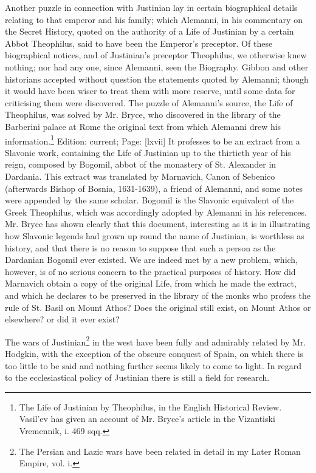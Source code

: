 Another puzzle in connection with Justinian lay in certain biographical details relating to that emperor and his family; which Alemanni, in his commentary on the Secret History, quoted on the authority of a Life of Justinian by a certain Abbot Theophilus, said to have been the Emperor\texthebrew{}’s preceptor. Of these biographical notices, and of Justinian\texthebrew{}’s preceptor Theophilus, we otherwise knew nothing; nor had any one, since Alemanni, seen the Biography. Gibbon and other historians accepted without question the statements quoted by Alemanni; though it would have been wiser to treat them with more reserve, until some data for criticising them were discovered. The puzzle of Alemanni\texthebrew{}’s source, the Life of Theophilus, was solved by Mr. Bryce, who discovered in the library of the Barberini palace at Rome the original text from which Alemanni drew his information.\footnote{The Life of Justinian by Theophilus, in the English Historical Review. Vasil\texthebrew{}’ev has given an account of Mr. Bryce\texthebrew{}’s article in the Vizantiski Vremennik, i. 469 sqq.} Edition: current; Page: [lxvii] It professes to be an extract from a Slavonic work, containing the Life of Justinian up to the thirtieth year of his reign, composed by Bogomil, abbot of the monastery of St. Alexander in Dardania. This extract was translated by Marnavich, Canon of Sebenico (afterwards Bishop of Bosnia, 1631-1639), a friend of Alemanni, and some notes were appended by the same scholar. Bogomil is the Slavonic equivalent of the Greek Theophilus, which was accordingly adopted by Alemanni in his references. Mr. Bryce has shown clearly that this document, interesting as it is in illustrating how Slavonic legends had grown up round the name of Justinian, is worthless as history, and that there is no reason to suppose that such a person as the Dardanian Bogomil ever existed. We are indeed met by a new problem, which, however, is of no serious concern to the practical purposes of history. How did Marnavich obtain a copy of the original Life, from which he made the extract, and which he declares to be preserved in the library of the monks who profess the rule of St. Basil on Mount Athos? Does the original still exist, on Mount Athos or elsewhere? or did it ever exist?

The wars of Justinian\footnote{The Persian and Lazic wars have been related in detail in my Later Roman Empire, vol. i.} in the west have been fully and admirably related by Mr. Hodgkin, with the exception of the obscure conquest of Spain, on which there is too little to be said and nothing further seems likely to come to light. In regard to the ecclesiastical policy of Justinian there is still a field for research.


